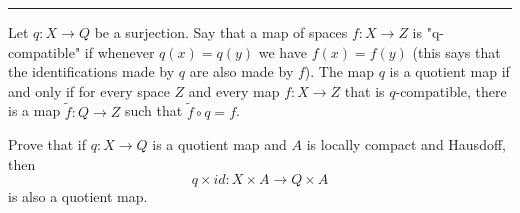 \documentclass[letterpaper, 12pt]{article}
\begin{document}
\noindent\rule{7in}{2.8pt}
\begin{problem}{4}
Let \(q:X\rightarrow Q\) be a surjection. Say that a map of spaces \(f:X\rightarrow Z\) is "q-compatible" if whenever \(q(x)=q(y)\) we have \(f(x)=f(y)\) (this says that the identifications made by \(q\) are also made by \(f\)). The map \(q\) is a quotient map if and only if for every space \(Z\) and every map \(f:X\rightarrow Z\) that is \(q\)-compatible, there is a map \(\tilde{f}:Q\rightarrow Z\) such that \(\tilde{f}\circ q=f\). 

Prove that if \(q:X\rightarrow Q\) is a quotient map and \(A\) is locally compact and Hausdoff, then 
\[q\times id:X\times A\rightarrow Q\times A\]
 is also a quotient map.
\end{problem}
\end{document}
